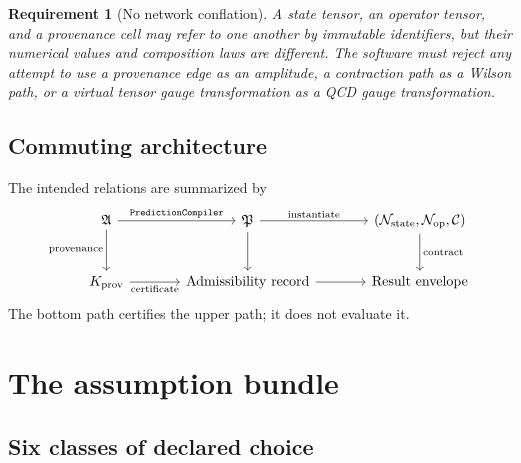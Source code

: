 \documentclass[11pt]{article}
\newtheorem{requirement}[definition]{Requirement}
\newcommand{\cC}{\mathcal C}
\newcommand{\Aset}{\mathfrak A}
\newcommand{\Pplan}{\mathfrak P}
\newcommand{\Nstate}{\mathcal N_{\mathrm{state}}}
\newcommand{\Nop}{\mathcal N_{\mathrm{op}}}
\newcommand{\Kprov}{K_{\mathrm{prov}}}
\newcommand{\Compiler}{\texttt{PredictionCompiler}}
\begin{document}
\begin{requirement}[No network conflation]
A state tensor, an operator tensor, and a provenance cell may refer to one
another by immutable identifiers, but their numerical values and composition
laws are different.  The software must reject any attempt to use a provenance
edge as an amplitude, a contraction path as a Wilson path, or a virtual tensor
gauge transformation as a QCD gauge transformation.
\end{requirement}

\subsection{Commuting architecture}

The intended relations are summarized by
\begin{equation}
\begin{tikzcd}[column sep=large,row sep=large]
 \Aset \arrow[r,"\Compiler"] \arrow[d,"\mathrm{provenance}"']
 & \Pplan \arrow[r,"\mathrm{instantiate}"] \arrow[d]
 & (\Nstate,\Nop,\cC) \arrow[d,"\mathrm{contract}"] \\
 \Kprov \arrow[r,"\mathrm{certificate}"']
 & \mathrm{Admissibility\ record} \arrow[r]
 & \mathrm{Result\ envelope}
\end{tikzcd}
\label{eq:three-network-diagram}
\end{equation}
The bottom path certifies the upper path; it does not evaluate it.

\section{The assumption bundle}
\label{sec:assumption-bundle}

\subsection{Six classes of declared choice}
\end{document}
